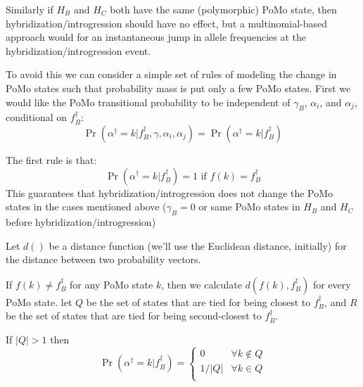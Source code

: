 \documentclass{article}
\begin{document}
Similarly if $H_B$ and $H_C$ both have the same (polymorphic) PoMo state, then hybridization/introgression should
have no effect, but a multinomial-based approach would for an instantaneous jump in allele frequencies
at the hybridization/introgression event.

To avoid this we can consider a simple set of rules of modeling the change in PoMo states such that probability mass is put only a few PoMo states.
First we would like the PoMo transitional probability to be independent of $\gamma_B$, $\alpha_i$, and $\alpha_j$, conditional on $f^{\dag}_B$:
\begin{equation}
    \Pr\left(\alpha^{\dag}=k |f^{\dag}_B, \gamma, \alpha_i, \alpha_j\right) = \Pr\left(\alpha^{\dag}=k | f^{\dag}_B\right)
\end{equation}

The first rule is that:
\begin{equation}
    \Pr\left(\alpha^{\dag}=k | f^{\dag}_B\right)=1\mbox{ if }f(k) = f^{\dag}_B
\end{equation}
This guarantees that hybridization/introgression does not change the PoMo states in the cases mentioned above ($\gamma_B=0$ or same PoMo states in $H_B$ and $H_C$ before hybridization/introgression)

Let $d()$ be a distance function (we'll use the Euclidean distance, initially) for the distance between two probability vectors.

If $f(k) \neq f^{\dag}_B$ for any PoMo state $k$, then we calculate $d(f(k), f^{\dag}_B)$ for every PoMo state.
let $Q$ be the set of states that are tied for being closest to $f^{\dag}_B$, and $R$ be the set of states that are tied for being second-closest to $f^{\dag}_B$.

If $|Q| > 1$ then
\begin{equation}
    \Pr\left(\alpha^{\dag}=k | f^{\dag}_B\right)= \left\{
  \begin{array}{ll}
   0 & \forall k \notin Q  \\
   1/|Q| & \forall k \in Q  \\
   \end{array}\right.
\end{equation}
\end{document}
